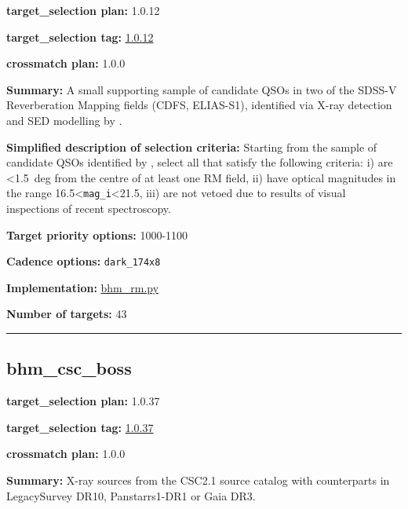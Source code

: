 \noindent\textbf{target\_selection plan:} 1.0.12

\noindent\textbf{target\_selection tag:}
\href{https://github.com/sdss/target_selection/tree/1.0.12/}{1.0.12}

\noindent\textbf{crossmatch plan:} 1.0.0

\noindent\textbf{Summary:} A small supporting sample of candidate QSOs in two of
the SDSS-V Reverberation Mapping fields (CDFS, ELIAS-S1), identified via
X-ray detection and SED modelling by
\citealt{Ni2021}.

\noindent\textbf{Simplified description of selection criteria:} Starting from the
sample of candidate QSOs identified by
\citealt{Ni2021}, select all that satisfy the following criteria: i) are
\textless1.5~deg from the centre of at least one RM field, ii) have
optical magnitudes in the range
16.5\textless{}\texttt{mag\_i}\textless21.5, iii) are not vetoed due to
results of visual inspections of recent spectroscopy.


\noindent\textbf{Target priority options:} 1000-1100

\noindent\textbf{Cadence options:} \texttt{dark\_174x8}

\noindent\textbf{Implementation:}
\href{https://github.com/sdss/target_selection/blob/1.0.12/python/target_selection/cartons/bhm_rm.py}{bhm\_rm.py}

\noindent\textbf{Number of targets:} 43

\begin{center}\rule{0.5\linewidth}{0.5pt}\end{center}

\hypertarget{bhm_csc_boss_plan1.0.37}{%
\subsection{bhm\_csc\_boss}\label{bhm_csc_boss_plan1.0.37}}

\noindent\textbf{target\_selection plan:} 1.0.37

\noindent\textbf{target\_selection tag:}
\href{https://github.com/sdss/target_selection/tree/1.0.37/}{1.0.37}

\noindent\textbf{crossmatch plan:} 1.0.0

\noindent\textbf{Summary:} X-ray sources from the CSC2.1 source catalog with
counterparts in LegacySurvey DR10, Panstarrs1-DR1 or Gaia DR3.

